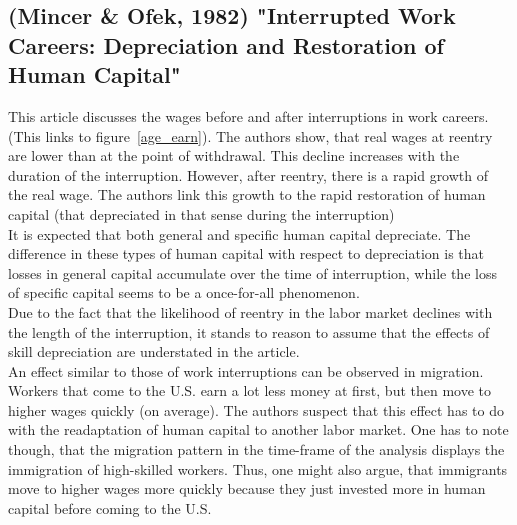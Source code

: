 \documentclass[12pt,a4paper]{article}
\begin{document}
  \subsection{(Mincer \& Ofek, 1982) "Interrupted Work Careers: Depreciation and Restoration of Human Capital"} %
  \label{sub:mincer}
  This article discusses the wages before and after interruptions in work careers. (This links to figure~\ref{age_earn}).
  The authors show, that real wages at reentry are lower than at the point of withdrawal. This decline increases with the
  duration of the interruption. However, after reentry, there is a rapid growth of the real wage. The authors link this 
  growth to the rapid restoration of human capital (that depreciated in that sense during the interruption)\\
  It is expected that both general and specific human capital depreciate. The difference in these types of human capital
  with respect to depreciation is that losses in general capital accumulate over the time of interruption, while
  the loss of specific capital seems to be a once-for-all phenomenon.\\
  Due to the fact that the likelihood of reentry in the labor market declines with the length of the interruption, 
  it stands to reason to assume that the effects of skill depreciation are understated in the article.\\
  An effect similar to those of work interruptions can be observed in migration. Workers that come to the U.S. earn a
  lot less money at first, but then move to higher wages quickly (on average). The authors suspect that this effect
  has to do with the readaptation of human capital to another labor market. One has to note though, that the migration
  pattern in the time-frame of the analysis displays the immigration of high-skilled workers. Thus, one might also
  argue, that immigrants move to higher wages more quickly because they just invested more in human capital before
  coming to the U.S.

\end{document}
